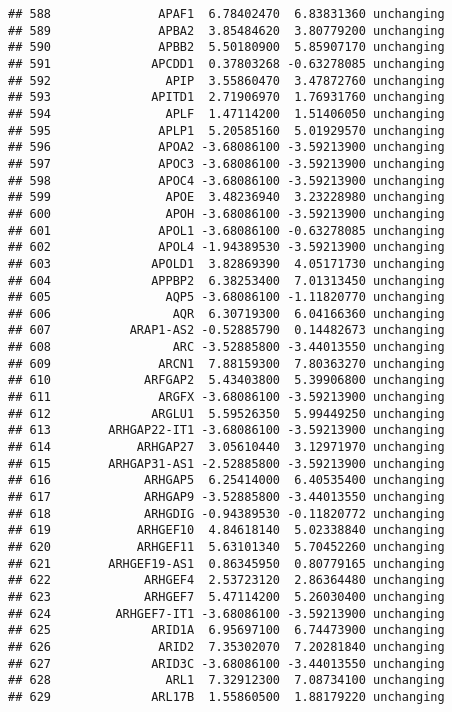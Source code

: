 \documentclass[]{article}
\begin{document}
\begin{verbatim}
## 588               APAF1  6.78402470  6.83831360 unchanging
## 589               APBA2  3.85484620  3.80779200 unchanging
## 590               APBB2  5.50180900  5.85907170 unchanging
## 591              APCDD1  0.37803268 -0.63278085 unchanging
## 592                APIP  3.55860470  3.47872760 unchanging
## 593              APITD1  2.71906970  1.76931760 unchanging
## 594                APLF  1.47114200  1.51406050 unchanging
## 595               APLP1  5.20585160  5.01929570 unchanging
## 596               APOA2 -3.68086100 -3.59213900 unchanging
## 597               APOC3 -3.68086100 -3.59213900 unchanging
## 598               APOC4 -3.68086100 -3.59213900 unchanging
## 599                APOE  3.48236940  3.23228980 unchanging
## 600                APOH -3.68086100 -3.59213900 unchanging
## 601               APOL1 -3.68086100 -0.63278085 unchanging
## 602               APOL4 -1.94389530 -3.59213900 unchanging
## 603              APOLD1  3.82869390  4.05171730 unchanging
## 604              APPBP2  6.38253400  7.01313450 unchanging
## 605                AQP5 -3.68086100 -1.11820770 unchanging
## 606                 AQR  6.30719300  6.04166360 unchanging
## 607           ARAP1-AS2 -0.52885790  0.14482673 unchanging
## 608                 ARC -3.52885800 -3.44013550 unchanging
## 609               ARCN1  7.88159300  7.80363270 unchanging
## 610             ARFGAP2  5.43403800  5.39906800 unchanging
## 611               ARGFX -3.68086100 -3.59213900 unchanging
## 612              ARGLU1  5.59526350  5.99449250 unchanging
## 613        ARHGAP22-IT1 -3.68086100 -3.59213900 unchanging
## 614            ARHGAP27  3.05610440  3.12971970 unchanging
## 615        ARHGAP31-AS1 -2.52885800 -3.59213900 unchanging
## 616             ARHGAP5  6.25414000  6.40535400 unchanging
## 617             ARHGAP9 -3.52885800 -3.44013550 unchanging
## 618             ARHGDIG -0.94389530 -0.11820772 unchanging
## 619            ARHGEF10  4.84618140  5.02338840 unchanging
## 620            ARHGEF11  5.63101340  5.70452260 unchanging
## 621        ARHGEF19-AS1  0.86345950  0.80779165 unchanging
## 622             ARHGEF4  2.53723120  2.86364480 unchanging
## 623             ARHGEF7  5.47114200  5.26030400 unchanging
## 624         ARHGEF7-IT1 -3.68086100 -3.59213900 unchanging
## 625              ARID1A  6.95697100  6.74473900 unchanging
## 626               ARID2  7.35302070  7.20281840 unchanging
## 627              ARID3C -3.68086100 -3.44013550 unchanging
## 628                ARL1  7.32912300  7.08734100 unchanging
## 629              ARL17B  1.55860500  1.88179220 unchanging

\end{verbatim}
\end{document}
